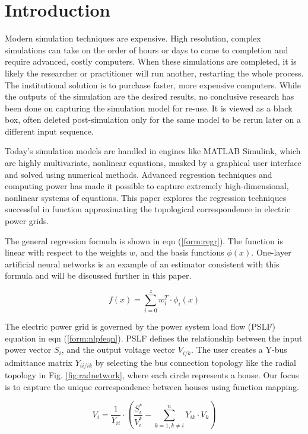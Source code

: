 \documentclass[conference]{IEEEtran}
\begin{document}
\section{Introduction}
\label{sec:intro}
Modern simulation techniques are expensive. High resolution, complex simulations can take on the order of hours or days to come to completion and require advanced, costly computers. When these simulations are completed, it is likely the researcher or practitioner will run another, restarting the whole process. The institutional solution is to purchase faster, more expensive computers. While the outputs of the simulation are the desired results, no conclusive research has been done on capturing the simulation model for re-use. It is viewed as a black box, often deleted post-simulation only for the same model to be rerun later on a different input sequence.

Today's simulation models are handled in engines like MATLAB Simulink, which are highly multivariate, nonlinear equations, masked by a graphical user interface and solved using numerical methods. Advanced regression techniques and computing power has made it possible to capture extremely high-dimensional, nonlinear systems of equations. This paper explores the regression techniques successful in function approximating the topological correspondence in electric power grids.

The general regression formula is shown in eqn (\ref{form:regr}). The function is linear with respect to the weights $w$, and the basis functions $\phi(x)$. One-layer artificial neural networks is an example of an estimator consistent with this formula and will be discussed further in this paper.

\begin{equation} f(x) = \sum_{i =0}^{z}w_{i}^{T} \cdot \phi_{i}(x) \label{form:regr} \end{equation} 

The electric power grid is governed by the power system load flow (PSLF) equation in eqn (\ref{form:nlpfeqn}). PSLF defines the relationship between the input power vector $S_{i}$, and the output voltage vector $V_{i/k}$. The user creates a Y-bus admittance matrix $Y_{ii/ik}$ by selecting the bus connection topology like the radial topology in Fig. \ref{fig:radnetwork}, where each circle represents a house. Our focus is to capture the unique correspondence between houses using function mapping.

\begin{equation} V_i = \frac{1}{Y_{ii}} \cdot \left(\frac{S_i^*}{V_i^*} - \displaystyle\sum_{k=1,k \neq i}^{n} Y_{ik} \cdot V_k\right) \label{form:nlpfeqn} \end{equation}
\end{document}
